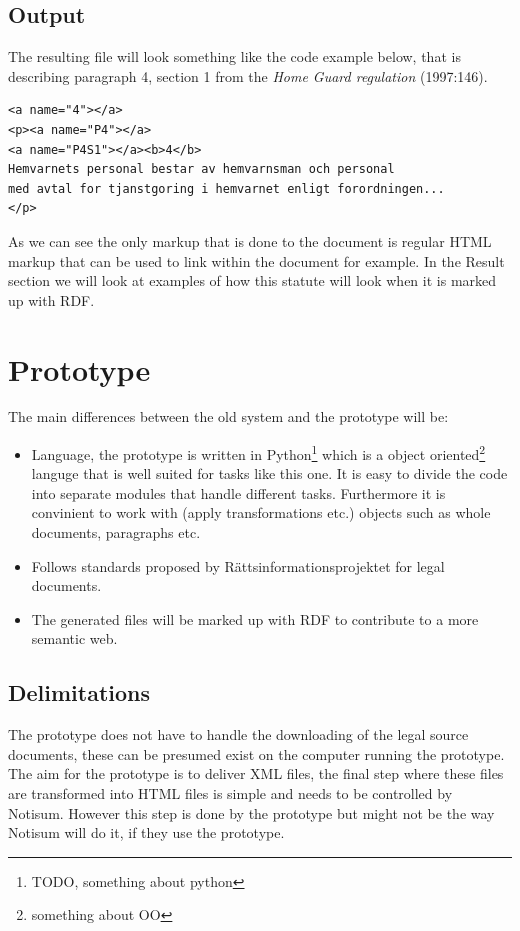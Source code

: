 \subsection{Output}
The resulting file will look something like the code example below, that is describing paragraph 4, section 1 from the \textit{Home Guard regulation} (1997:146).\\
\begin{verbatim}
<a name="4"></a>
<p><a name="P4"></a>
<a name="P4S1"></a><b>4</b> 
Hemvarnets personal bestar av hemvarnsman och personal 
med avtal for tjanstgoring i hemvarnet enligt forordningen...
</p>
\end{verbatim}
\linebreak
\newline
As we can see the only markup that is done to the document is regular HTML markup that can be used to link within the document for example. In the Result section we will look at examples of how this statute will look when it is marked up with RDF.   

\section{Prototype}
The main differences between the old system and the prototype will be: 
\begin{itemize}
\item Language, the prototype is written in Python\footnote{TODO, something about python} which is a object oriented\footnote{something about OO} languge that is well suited for tasks like this one. It is easy to divide the code into separate modules that handle different tasks. Furthermore it is convinient to work with (apply transformations etc.) objects such as whole documents, paragraphs etc. 
\item Follows standards proposed by Rättsinformationsprojektet for legal documents.   
\item The generated files will be marked up with RDF to contribute to a more semantic web. 
\end{itemize} 

\subsection{Delimitations}
The prototype does not have to handle the downloading of the legal source documents, these can be presumed exist on the computer running the prototype. \\The aim for the prototype is to deliver XML files, the final step where these files are transformed into HTML files is simple and needs to be controlled by Notisum. However this step is done by the prototype but might not be the way Notisum will do it, if they use the prototype.
